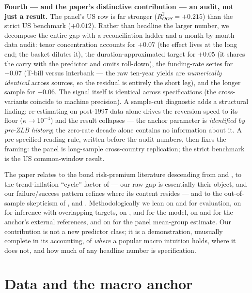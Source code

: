 \documentclass[11pt]{article}
\begin{document}
\textbf{Fourth --- and the paper's distinctive contribution --- an audit, not just a
result.} The panel's US row is far stronger ($R^2_{OOS}=+0.215$) than the strict US
benchmark ($+0.012$). Rather than headline the larger number, we decompose the entire gap
with a reconciliation ladder and a month-by-month data audit: tenor concentration accounts
for $+0.07$ (the effect lives at the long end; the basket dilutes it), the
duration-approximated target for $+0.05$ (it shares the carry with the predictor and omits
roll-down), the funding-rate series for $+0.07$ (T-bill versus interbank --- the raw
ten-year yields are \emph{numerically identical} across sources, so the residual is
entirely the short leg), and the longer sample for $+0.06$. The signal itself is identical
across specifications (the cross-variants coincide to machine precision). A sample-cut
diagnostic adds a structural finding: re-estimating on post-1997 data alone drives the
reversion speed to its floor ($\kappa\to 10^{-4}$) and the result collapses --- the anchor
parameter is \emph{identified by pre-ZLB history}; the zero-rate decade alone contains no
information about it. A pre-specified reading rule, written before the audit numbers, then fixes
the framing: the panel is long-sample cross-country replication; the strict benchmark is
the US common-window result.

The paper relates to the bond risk-premium literature descending from \citet{famabliss}
and \citet{cochranepiazzesi}, to the trend-inflation ``cycle'' factor of
\citet{cieslakpovala} --- our raw gap is essentially their object, and our failure/success
pattern refines where its content resides --- and to the out-of-sample skepticism of
\citet{goyalwelch}, \citet{bauerhamilton} and \citet{duffee}. Methodologically we lean on
\citet{campbellthompson} and \citet{clarkwest} for evaluation, on \citet{neweywest} for
inference with overlapping targets, on \citet{vasicek}, \citet{cir} and \citet{hullwhite}
for the model, on \citet{hlw} and \citet{kimwright} for the anchor's external references,
and on \citet{pesaransmith} for the panel mean-group estimate. Our contribution is not a
new predictor class; it is a demonstration, unusually complete in its accounting, of
\emph{where} a popular macro intuition holds, where it does not, and how much of any
headline number is specification.

\section{Data and the macro anchor}\label{sec:data}
\end{document}
